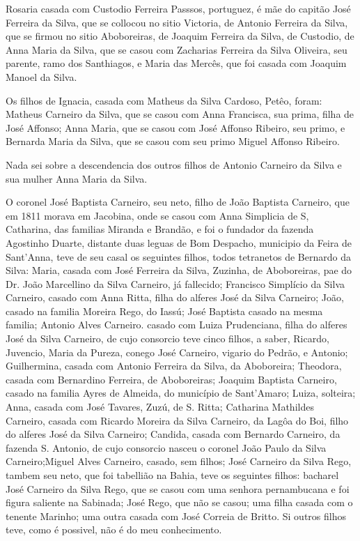 Rosaria casada com Custodio Ferreira Passsos, portuguez, é mãe do capitão José Ferreira da Silva, que se collocou no sitio Victoria, de Antonio Ferreira da Silva, que se firmou no sitio Aboboreiras, de Joaquim Ferreira da Silva, de Custodio, de Anna Maria da Silva, que se casou com Zacharias Ferreira da Silva Oliveira, seu parente, ramo dos Santhiagos, e Maria das Mercês, que foi casada com Joaquim Manoel da Silva.

Os filhos de Ignacia, casada com Matheus da Silva Cardoso, Petêo, foram: Matheus Carneiro da Silva, que se casou com Anna Francisca, sua prima, filha de José Affonso; Anna Maria, que se casou com José Affonso Ribeiro, seu primo, e Bernarda Maria da Silva, que se casou com seu primo Miguel Affonso Ribeiro.

Nada sei sobre a descendencia dos outros filhos de Antonio Carneiro da Silva e sua mulher Anna Maria da Silva.

O coronel José Baptista Carneiro, seu neto, filho de João Baptista Carneiro, que em 1811 morava em Jacobina, onde se casou com Anna Simplicia de S, Catharina, das familias Miranda e Brandão, e foi o fundador da fazenda Agostinho Duarte, distante duas leguas de Bom Despacho, municipio da Feira de Sant'Anna, teve de seu casal os seguintes filhos, todos tetranetos de Bernardo da Silva: Maria, casada com José Ferreira da Silva, Zuzinha, de Aboboreiras, pae do Dr. João Marcellino da Silva Carneiro, já fallecido; Francisco Simplício da Silva Carneiro, casado com Anna Ritta, filha do alferes José da Silva Carneiro; João, casado na familia Moreira Rego, do Iassú; José Baptista casado na mesma familia; Antonio Alves Carneiro. casado com Luiza Prudenciana, filha do alferes José da Silva Carneiro, de cujo consorcio teve cinco filhos, a saber, Ricardo, Juvencio, Maria da Pureza, conego José Carneiro, vigario do Pedrão, e Antonio; Guilhermina, casada com Antonio Ferreira da Silva, da Aboboreira; Theodora, casada com Bernardino Ferreira, de Aboboreiras; Joaquim Baptista Carneiro, casado na familia Ayres de Almeida, do município de Sant'Amaro; Luiza, solteira; Anna, casada com José Tavares, Zuzú, de S. Ritta; Catharina Mathildes Carneiro, casada com Ricardo Moreira da Silva Carneiro, da Lagôa do Boi, filho do alferes José da Silva Carneiro; Candida, casada com Bernardo Carneiro, da fazenda S. Antonio, de cujo consorcio nasceu o coronel João Paulo da Silva Carneiro;Miguel Alves Carneiro, casado, sem filhos; José Carneiro da Silva Rego, tambem seu neto, que foi tabellião na Bahia, teve os seguintes filhos: bacharel José Carneiro da Silva Rego, que se
casou com uma senhora pernambucana e foi figura saliente na Sabinada; José Rego, que não se casou; uma filha casada com o tenente Marinho; uma outra casada com José Correia de Britto.
Si outros filhos teve, como é possivel, não é do meu conhecimento.


